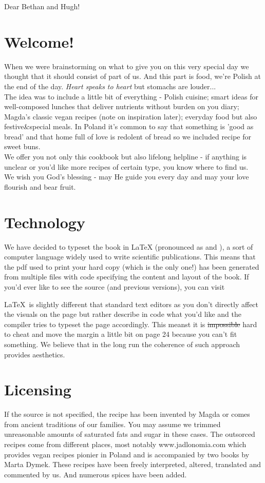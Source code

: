 
Dear Bethan and Hugh!

\section*{Welcome!}
When we were brainstorming on what to give you on this very special day we thought that it should consist of part of us. And this part is food, we're Polish at the end of the day. \textit{Heart speaks to heart} but stomachs are louder...
\\
The idea was to include a little bit of everything - Polish cuisine; smart ideas for well-composed lunches that deliver nutrients without burden on you diary; Magda's classic vegan recipes (note on inspiration later); everyday food but also festive\&special meals. In Poland it's common to say that something is 'good as bread' and that home full of love is redolent of bread so we included recipe for sweet buns.\\
We offer you not only this cookbook but also lifelong helpline - if anything is unclear or you'd like more recipes of certain type, you know where to find us.\\
We wish you God's blessing - may He guide you every day and may your love flourish and bear fruit.


\section*{Technology}
We have decided to typeset the book in \LaTeX{} (pronounced as  and ),
a sort of computer language widely used to write scientific publications.
This means that the pdf used to print your hard copy (which is the only one!)
has been generated from multiple files with code specifying the content and layout
of the book.
If you'd ever like to see the source (and previous versions),
you can visit 

\LaTeX{}~is slightly different that standard text editors as you don't directly affect the visuals
on the page but rather describe in code what you'd like and the compiler tries to
typeset the page accordingly.
This meanst it is \sout{impossible} hard to cheat and
move the margin a little bit on page 24 because you can't fit something.
We believe that in the long run the coherence of such approach provides aesthetics.

\section*{Licensing}
If the source is not specified, the recipe has been invented by Magda or comes from
ancient traditions of our families.
You may assume we trimmed unreasonable amounts of saturated fats and sugar in these cases.
The outsorced recipes come from different places, most notably www.jadlonomia.com which
provides vegan recipes pionier in Poland and is accompanied by two books by Marta Dymek.
These recipes have been freely interpreted, altered, translated and commented by us. And numerous spices have been added.

